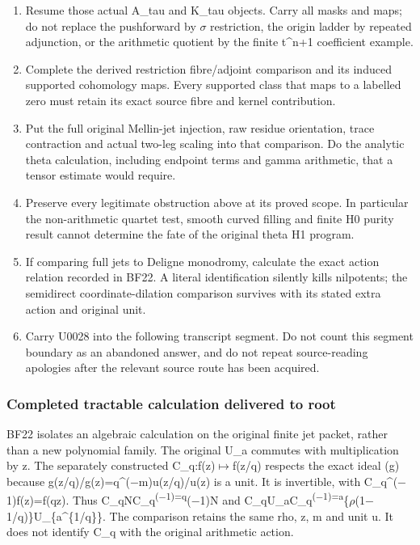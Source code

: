 \begin{enumerate}
\def\labelenumi{\arabic{enumi}.}
\tightlist
\item
  Resume those actual A\_tau and K\_tau objects. Carry all masks and
  maps; do not replace the pushforward by
  \allowbreak{}\ensuremath{σ}\allowbreak{} restriction, the origin
  ladder by repeated adjunction, or the arithmetic quotient by the
  finite t\^{}n+1 coefficient example.
\item
  Complete the derived restriction fibre/adjoint comparison and its
  induced supported cohomology maps. Every supported class that maps to
  a labelled zero must retain its exact source fibre and kernel
  contribution.
\item
  Put the full original Mellin-jet injection, raw residue orientation,
  trace contraction and actual two-leg scaling into that comparison. Do
  the analytic theta calculation, including endpoint terms and gamma
  arithmetic, that a tensor estimate would require.
\item
  Preserve every legitimate obstruction above at its proved scope. In
  particular the non-arithmetic quartet test, smooth curved filling and
  finite H0 purity result cannot determine the fate of the original
  theta H1 program.
\item
  If comparing full jets to Deligne monodromy, calculate the exact
  action relation recorded in BF22. A literal identification silently
  kills nilpotents; the semidirect coordinate-dilation comparison
  survives with its stated extra action and original unit.
\item
  Carry U0028 into the following transcript segment. Do not count this
  segment boundary as an abandoned answer, and do not repeat
  source-reading apologies after the relevant source route has been
  acquired.
\end{enumerate}

\subsubsection{Completed tractable calculation delivered to
root}\label{completed-tractable-calculation-delivered-to-root}

BF22 isolates an algebraic calculation on the original finite jet
packet, rather than a new polynomial family. The original U\_a commutes
with multiplication by z. The separately constructed
C\_q:f(z)\allowbreak{}\ensuremath{↦}\allowbreak{}f(z/q) respects the
exact ideal (g) because
g(z/q)/g(z)=q\textasciicircum{}(\allowbreak{}\ensuremath{−}\allowbreak{}m)u(z/q)/u(z)
is a unit. It is invertible, with
C\_q\textasciicircum{}(\allowbreak{}\ensuremath{−}\allowbreak{}1)f(z)=f(qz).
Thus
C\_qNC\_q\textsuperscript{(\allowbreak{}\ensuremath{−}\allowbreak{}1)=q}(\allowbreak{}\ensuremath{−}\allowbreak{}1)N
and
C\_qU\_aC\_q\textsuperscript{(\allowbreak{}\ensuremath{−}\allowbreak{}1)=a}\{\allowbreak{}\ensuremath{ρ}\allowbreak{}(1\allowbreak{}\ensuremath{−}\allowbreak{}1/q)\}U\_\{a\textasciicircum{}\{1/q\}\}.
The comparison retains the same rho, z, m and unit u. It does not
identify C\_q with the original arithmetic action.

